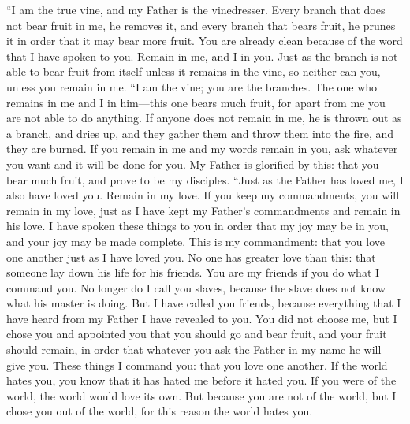 \begin{biblechapter} %
 “I am the true vine, and my Father is the vinedresser.
\verse Every branch that does not bear fruit in me, he removes it, and every branch that bears fruit, he prunes it in order that it may bear more fruit.
\verse You are already clean because of the word that I have spoken to you.
\verse Remain in me, and I in you. Just as the branch is not able to bear fruit from itself unless it remains in the vine, so neither can you, unless you remain in me.
\verse “I am the vine; you are the branches. The one who remains in me and I in him—this one bears much fruit, for apart from me you are not able to do anything.
\verse If anyone does not remain in me, he is thrown out as a branch, and dries up, and they gather them and throw them into the fire, and they are burned.
\verse If you remain in me and my words remain in you, ask whatever you want and it will be done for you.
\verse My Father is glorified by this: that you bear much fruit, and prove to be my disciples.
\verse “Just as the Father has loved me, I also have loved you. Remain in my love.
\verse If you keep my commandments, you will remain in my love, just as I have kept my Father’s commandments and remain in his love.
\verse I have spoken these things to you in order that my joy may be in you, and your joy may be made complete.
\verse This is my commandment: that you love one another just as I have loved you.
\verse No one has greater love than this: that someone lay down his life for his friends.
\verse You are my friends if you do what I command you.
\verse No longer do I call you slaves, because the slave does not know what his master is doing. But I have called you friends, because everything that I have heard from my Father I have revealed to you.
\verse You did not choose me, but I chose you and appointed you that you should go and bear fruit, and your fruit should remain, in order that whatever you ask the Father in my name he will give you.
\verse These things I command you: that you love one another.
 If the world hates you, you know that it has hated me before it hated you.
\verse If you were of the world, the world would love its own. But because you are not of the world, but I chose you out of the world, for this reason the world hates you.

\end{biblechapter}
